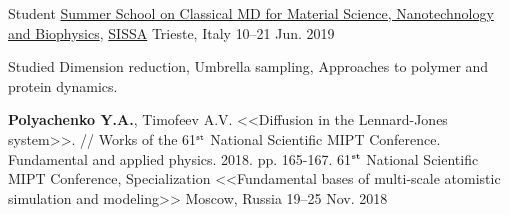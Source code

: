 \begin{cventries}
  \cventry
    {Student} %
    {\href{https://www.cecam.org/workshop-details/135}{Summer School on Classical MD for Material Science, Nanotechnology and Biophysics}, \href{https://www.sissa.it/}{SISSA}} %
    {Trieste, Italy} %
    {10--21 Jun. 2019} %
    {
      \begin{cvitems} %
        \item {Studied Dimension reduction, Umbrella sampling, Approaches to polymer and protein dynamics.}
      \end{cvitems}
    }
    
    
  \cventry
    {\textbf{Polyachenko Y.A.}, Timofeev A.V. <<Diffusion in the Lennard-Jones system>>. // Works of the 61$^{\texttt{\tiny st}}$ National Scientific MIPT Conference. Fundamental and applied physics. 2018. pp. 165-167.} %
    {61$^{\textbf{\tiny st}}$ National Scientific MIPT Conference, Specialization <<Fundamental bases of multi-scale atomistic simulation and modeling>>} %
    {Moscow, Russia} %
    {19--25 Nov. 2018} %
    {
    }
    

\end{cventries}

